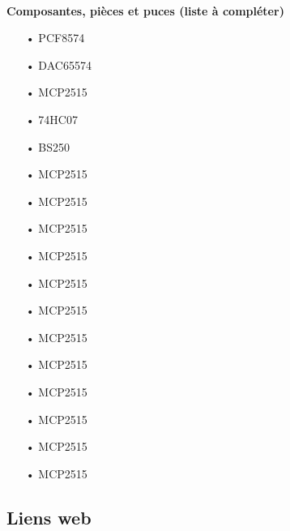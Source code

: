 \documentclass[10pt,a4paper,final]{article}
\begin{document}
\begin{spacing}{1.5}
\begin{center}
\HRule \\
\textbf{Composantes, pièces et puces (liste à compléter)}
\end{center}
\begin{multicols}{3}
\begin{itemize}
\item[•]PCF8574
\item[•]DAC65574
\item[•]MCP2515
\item[•]74HC07
\item[•]BS250
\item[•]MCP2515
\item[•]MCP2515
\item[•]MCP2515
\item[•]MCP2515
\item[•]MCP2515
\item[•]MCP2515
\item[•]MCP2515
\item[•]MCP2515
\item[•]MCP2515
\item[•]MCP2515
\item[•]MCP2515
\item[•]MCP2515
\end{itemize}
\end{multicols}
\begin{center}
\HRule
\end{center}



\subsection{Liens web}
\end{spacing}
\end{document}
